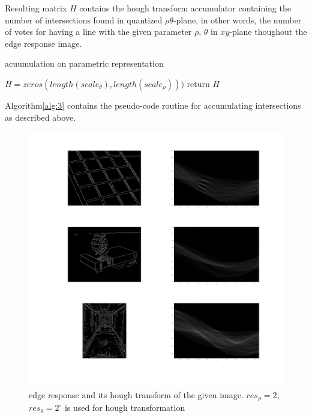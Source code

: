 \documentclass[extendedabs]{bmvc2k}
\begin{document}
Resulting matrix $H$ contains the hough transform accumulator containing the number of intersections found in quantized 
$\rho\theta$-plane, in other words, the number of votes for having a line with the given parameter $\rho$, $\theta$ in 
$xy$-plane thoughout the edge response image.

\begin{algorithm}
    \caption{acuumulation on parametric representation}
    \label{alg:3}
    $H = zeros(length(scale_{\theta}), length(scale_{\rho})))$\;
    return $H$\;
\end{algorithm}
Algorithm\ref{alg:3} contains the pseudo-code routine for accumulating intersections as described above.

\begin{figure}[h]
    \centering
    \includegraphics[width=\linewidth]{hw4_2_2}
    \caption{edge response and its hough transform of the given image. $res_{\rho} = 2$, $res_{\theta} = 2^{\circ}$
    is used for hough transformation}
    \label{fig:4}
\end{figure}
\end{document}
